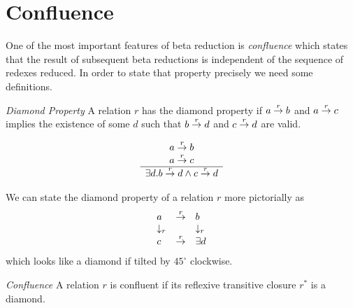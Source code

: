\section{Confluence}

One of the most important features of beta reduction is \emph{confluence} which
states that the result of subsequent beta reductions is independent of the
sequence of redexes reduced. In order to state that property precisely we need
some definitions.

\begin{definition}
    \emph{Diamond Property} A relation $r$ has the diamond property if $a
    \stackrel{r}{\to} b$ and $a \stackrel{r}{\to} c$ implies the existence of some $d$ such that
    $b \stackrel{r}{\to} d$ and $c \stackrel{r}{\to} d$ are valid.

    $$
    \begin{array}{c} 
        a \stackrel{r}{\to} b
        \\
        a \stackrel{r}{\to} c
     \\ \hline 
        \exists d. b \stackrel{r}{\to} d \land c \stackrel{r}{\to} d
    \end{array}
    $$
\end{definition}

We can state the diamond property of a relation $r$ more pictorially as
$$
\begin{array}{lll}
    a   &  \stackrel{r}{\to} &   b
    \\
    \downarrow_r & & \downarrow_r
    \\
    c & \stackrel{r}{\to} & \exists d
\end{array}
$$
which looks like a diamond if tilted by $45^\circ$ clockwise.


\begin{definition}
    \emph{Confluence} A relation $r$ is confluent if its reflexive transitive
    closure $r^*$ is a diamond.
\end{definition}


